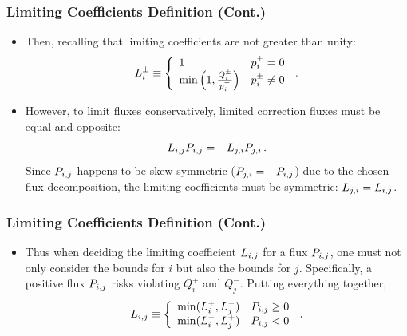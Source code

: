 \begin{frame}
\frametitle{Limiting Coefficients Definition (Cont.)}

\begin{itemize}
   \item Then, recalling that limiting coefficients are not greater than unity:
      \begin{equation}
         L_i^\pm \equiv\left\{
            \begin{array}{l l}
               1 & p_i^\pm = 0\\
               \min\left(1,\frac{Q_i^\pm}{p_i^\pm}\right) &
                 p_i^\pm \ne 0
            \end{array}
            \right. \,.
      \end{equation}
   \item However, to limit fluxes conservatively, limited correction fluxes must
      be equal and opposite:
      \begin{equation}
        L\ij \correctionfluxij = -L_{j,i}
          \MakeUppercase{\correctionfluxletter}_{j,i} \eqp
      \end{equation}
      Since $\correctionfluxij$ happens to be skew symmetric
      ($\MakeUppercase{\correctionfluxletter}_{j,i}=-\correctionfluxij$) due to the
      chosen flux decomposition, the limiting coefficients must be symmetric:
      $L_{j,i} = L_{i,j}$.
\end{itemize}

\end{frame}
\begin{frame}
\frametitle{Limiting Coefficients Definition (Cont.)}

\begin{itemize}
   \item Thus when deciding the limiting coefficient $L_{i,j}$ for a flux $\correctionfluxij$, 
      one must not only consider the bounds for $i$ but also the bounds for $j$.
      Specifically, a positive flux $\correctionfluxij$ risks violating $Q_i^+$ and $Q_j^-$.
      Putting everything together,
      \begin{equation}
         L\ij \equiv\left\{
            \begin{array}{l l}
               \min(L_i^+,L_j^-) & \correctionfluxij \geq 0\\
               \min(L_i^-,L_j^+) & \correctionfluxij < 0
            \end{array}
            \right. \eqp
      \end{equation}
\end{itemize}

\end{frame}
